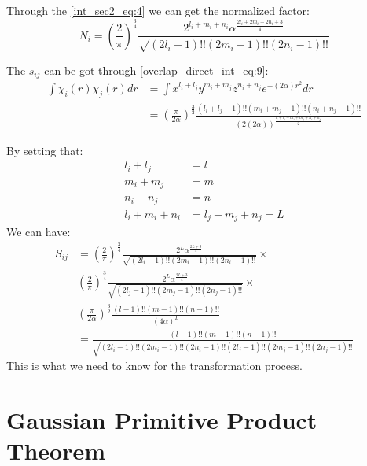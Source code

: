 Through the \ref{int_sec2_eq:4} we can get the normalized factor:
\begin{equation}
\label{transformation_p2c_eq:4}
N_{i} = \left( \frac{2}{\pi}\right)^{\frac{3}{4}} 
\frac{2^{l_{i}+m_{i}+n_{i}}\alpha^{\frac{2l_{i}+2m_{i}+2n_{i}+3}{4}}}
{\sqrt{(2l_{i}-1)!!(2m_{i}-1)!!(2n_{i}-1)!!}}
\end{equation}

The $s_{ij}$ can be got through \ref{overlap_direct_int_eq:9}:
\begin{align}
\int\chi_{i}(r)\chi_{j}(r) dr &= 
\int x^{l_{i}+l_{j}}y^{m_{i}+m_{j}}z^{n_{i}+n_{j}}e^{-(2\alpha)r^{2}} dr \nonumber \\
&= \left( \frac{\pi}{2\alpha}\right)^{\frac{3}{2}} 
\frac{(l_{i}+l_{j}-1)!!(m_{i}+m_{j}-1)!!(n_{i}+n_{j}-1)!!}
{(2(2\alpha))^{\frac{l_{i}+l_{j}+m_{i}+m_{j}+n_{i}+n_{j}}{2}}}
\end{align}

By setting that:
\begin{align}
 l_{i}+l_{j} &= l  \nonumber \\
 m_{i}+m_{j} &= m  \nonumber \\
 n_{i}+n_{j} &= n  \nonumber \\
 l_{i}+m_{i}+n_{i} &= l_{j}+m_{j}+n_{j} = L 
\end{align}
We can have:
\begin{align}
\label{transformation_p2c_eq:5}
 S_{ij} &= 
 \left( \frac{2}{\pi}\right)^{\frac{3}{4}} 
\frac{2^{L}\alpha^{\frac{2L+3}{4}}}{\sqrt{(2l_{i}-1)!!(2m_{i}-1)!!(2n_{i}-1)!!}} \times \nonumber \\
&\left( \frac{2}{\pi}\right)^{\frac{3}{4}} 
\frac{2^{L}\alpha^{\frac{2L+3}{4}}}{\sqrt{(2l_{j}-1)!!(2m_{j}-1)!!(2n_{j}-1)!!}} \times \nonumber \\
&\left( \frac{\pi}{2\alpha}\right)^{\frac{3}{2}} 
\frac{(l-1)!!(m-1)!!(n-1)!!}
{(4\alpha)^{L}} \nonumber \\
&= \frac{(l-1)!!(m-1)!!(n-1)!!}
{\sqrt{(2l_{i}-1)!!(2m_{i}-1)!!(2n_{i}-1)!!(2l_{j}-1)!!(2m_{j}-1)!!(2n_{j}-1)!!}}
\end{align}
This is what we need to know for the transformation process.

\section{Gaussian Primitive Product Theorem}
\label{Gaussian_Primitive_Product_Theorem}

